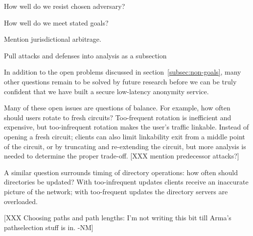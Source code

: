 \documentclass[times,10pt,twocolumn]{article}
\begin{document}
How well do we resist chosen adversary?

How well do we meet stated goals?

Mention jurisdictional arbitrage.

Pull attacks and defenses into analysis as a subsection

\label{sec:maintaining-anonymity}

In addition to the open problems discussed in
section~\ref{subsec:non-goals}, many other questions remain to be
solved by future research before we can be truly confident that we
have built a secure low-latency anonymity service.

Many of these open issues are questions of balance.  For example,
how often should users rotate to fresh circuits?  Too-frequent
rotation is inefficient and expensive, but too-infrequent rotation
makes the user's traffic linkable.   Instead of opening a fresh
circuit; clients can also limit linkability exit from a middle point
of the circuit, or by truncating and re-extending the circuit, but
more analysis is needed to determine the proper trade-off.
[XXX mention predecessor attacks?]

A similar question surrounds timing of directory operations:
how often should directories be updated?  With too-infrequent
updates clients receive an inaccurate picture of the network; with
too-frequent updates the directory servers are overloaded.

%

[XXX Choosing paths and path lengths: I'm not writing this bit till
  Arma's pathselection stuff is in. -NM]
\end{document}
